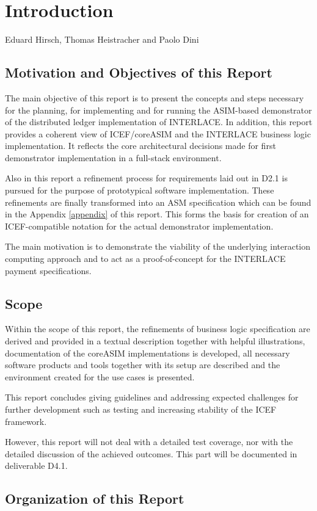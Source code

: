 \chapter{Introduction}
\label{ch:Introduction}

\vspace{-1cm}
\begin{center}
Eduard Hirsch, Thomas Heistracher and Paolo Dini
\end{center}


\section{Motivation and Objectives of this Report}

The main objective of this report is to present the concepts and steps necessary for the planning, for implementing and for running the ASIM-based demonstrator of the distributed ledger implementation of INTERLACE. In addition, this report provides a coherent view of ICEF/coreASIM and the INTERLACE business logic implementation. It reflects the core architectural decisions made for first demonstrator implementation in a full-stack environment.

Also in this report a refinement process for requirements laid out in D2.1 is pursued for the purpose of prototypical software implementation. These refinements are finally transformed into an ASM specification which can be found in the Appendix \ref{appendix} of this report. This forms the basis for creation of an ICEF-compatible notation for the actual demonstrator implementation.

The main motivation is to demonstrate the viability of the underlying interaction computing approach and to act as a proof-of-concept for the INTERLACE payment specifications.

\section{Scope}

Within the scope of this report, the refinements of business logic specification are derived and provided in a textual description together with helpful illustrations, documentation of the coreASIM implementations is developed, all necessary software products and tools together with its setup are described and the environment created for the use cases is presented.

This report concludes giving guidelines and addressing expected challenges for further development such as testing and increasing stability of the ICEF framework.

However, this report will not deal with a detailed test coverage, nor with the detailed discussion of the achieved outcomes. This part will be documented in deliverable D4.1.

\section{Organization of this Report}


\newpage
